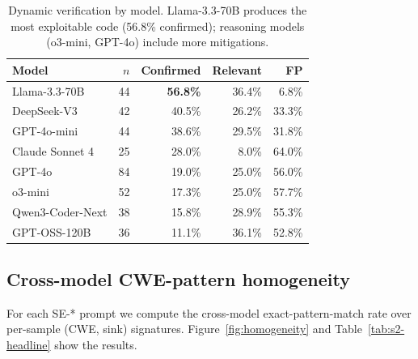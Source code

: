 \documentclass{article}
\begin{document}
\begin{table}[h]
\centering\small
\begin{tabular}{lrrrr}
\toprule
Model & $n$ & Confirmed & Relevant & FP \\
\midrule
Llama-3.3-70B    & 44 & \textbf{56.8\%} & 36.4\% &  6.8\% \\
DeepSeek-V3      & 42 & 40.5\% & 26.2\% & 33.3\% \\
GPT-4o-mini      & 44 & 38.6\% & 29.5\% & 31.8\% \\
Claude Sonnet 4  & 25 & 28.0\% &  8.0\% & 64.0\% \\
GPT-4o           & 84 & 19.0\% & 25.0\% & 56.0\% \\
o3-mini          & 52 & 17.3\% & 25.0\% & 57.7\% \\
Qwen3-Coder-Next & 38 & 15.8\% & 28.9\% & 55.3\% \\
GPT-OSS-120B     & 36 & 11.1\% & 36.1\% & 52.8\% \\
\bottomrule
\end{tabular}
\caption{Dynamic verification by model. Llama-3.3-70B produces the most
exploitable code (56.8\% confirmed); reasoning models (o3-mini, GPT-4o)
include more mitigations.}
\label{tab:by-model-verification}
\end{table}

\subsection{Cross-model CWE-pattern homogeneity}
\label{sec:s2}

For each SE-* prompt we compute the cross-model exact-pattern-match rate
over per-sample (CWE, sink) signatures. Figure~\ref{fig:homogeneity} and
Table~\ref{tab:s2-headline} show the results.
\end{document}
